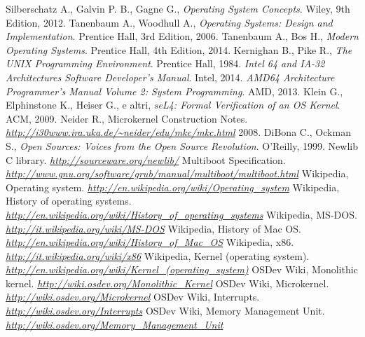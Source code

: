 \documentclass[12pt,a4paper]{report}
\begin{document}
\begin{thebibliography}{}
		Silberschatz A., Galvin P. B., Gagne G.,
		\emph{Operating System Concepts}.
		Wiley,
		9th Edition,
		2012.
		Tanenbaum A., Woodhull A.,
		\emph{Operating Systems: Design and Implementation}.
		Prentice Hall,
		3rd Edition,
		2006.
		Tanenbaum A., Bos H.,
		\emph{Modern Operating Systems}.
		Prentice Hall,
		4th Edition,
		2014.
		Kernighan B., Pike R.,
		\emph{The UNIX Programming Environment}.
		Prentice Hall,
		1984.
		\emph{Intel 64 and IA-32 Architectures Software Developer’s Manual}.
		Intel,
		2014.
		\emph{AMD64 Architecture Programmer’s Manual Volume 2: System Programming}.
		AMD,
		2013.
		Klein G., Elphinstone K., Heiser G., e altri,
		\emph{seL4: Formal Verification of an OS Kernel}.
		ACM,
		2009.
		Neider R.,
		Microkernel Construction Notes.
		\emph{\url{http://i30www.ira.uka.de/~neider/edu/mkc/mkc.html}}
		2008.
		DiBona C., Ockman S.,
		\emph{Open Sources: Voices from the Open Source Revolution}.
		O'Reilly,
		1999.
		Newlib C library.
		\emph{\url{http://sourceware.org/newlib/}}
		Multiboot Specification.
		\emph{\url{http://www.gnu.org/software/grub/manual/multiboot/multiboot.html}}
		Wikipedia, Operating system.
		\emph{\url{http://en.wikipedia.org/wiki/Operating_system}}
		Wikipedia, History of operating systems.
		\emph{\url{http://en.wikipedia.org/wiki/History_of_operating_systems}}
		Wikipedia, MS-DOS.
		\emph{\url{http://it.wikipedia.org/wiki/MS-DOS}}
		Wikipedia, History of Mac OS.
		\emph{\url{http://en.wikipedia.org/wiki/History_of_Mac_OS}}
		Wikipedia, x86.
		\emph{\url{http://it.wikipedia.org/wiki/x86}}
		Wikipedia, Kernel (operating system).
		\emph{\url{http://en.wikipedia.org/wiki/Kernel_(operating_system)}}
		OSDev Wiki, Monolithic kernel.
		\emph{\url{http://wiki.osdev.org/Monolithic_Kernel}}
		OSDev Wiki, Microkernel.
		\emph{\url{http://wiki.osdev.org/Microkernel}}
		OSDev Wiki, Interrupts.
		\emph{\url{http://wiki.osdev.org/Interrupts}}
		OSDev Wiki, Memory Management Unit.
		\emph{\url{http://wiki.osdev.org/Memory_Management_Unit}}
\end{thebibliography}
\end{document}
